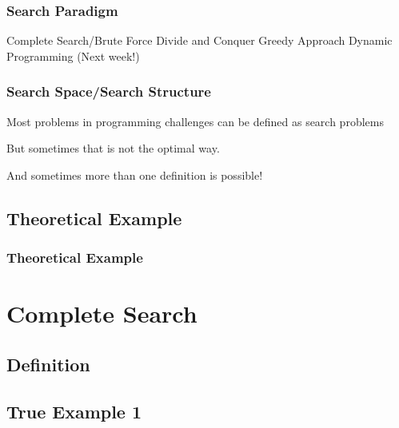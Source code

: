 \documentclass{beamer}
\begin{document}
\begin{frame}
  \frametitle{Search Paradigm}
  Complete Search/Brute Force
  Divide and Conquer
  Greedy Approach
  Dynamic Programming (Next week!)
\end{frame}

\begin{frame}
  \frametitle{Search Space/Search Structure}
  Most problems in programming challenges can be defined
  as search problems

  But sometimes that is not the optimal way.

  And sometimes more than one definition is possible!
\end{frame}


\subsection{Theoretical Example}

\begin{frame}
  \frametitle{Theoretical Example}

\end{frame}

\begin{frame}
\end{frame}

\section{Complete Search}
\subsection{Definition}

\subsection{True Example 1}
\end{document}

